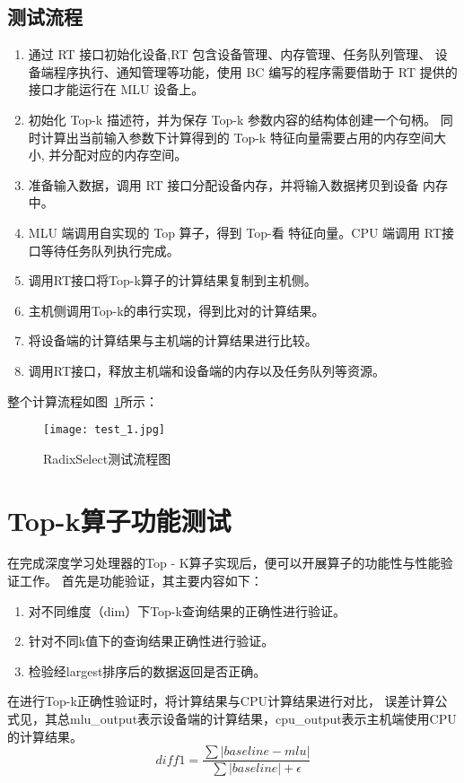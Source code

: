 \subsection{测试流程}
\begin{enumerate}
    \item 通过 RT 接口初始化设备,RT 包含设备管理、内存管理、任务队列管理、 设备端程序执行、通知管理等功能，使用 BC 编写的程序需要借助于 RT 提供的 接口才能运行在 MLU 设备上。
    \item 初始化 Top-k 描述符，并为保存 Top-k 参数内容的结构体创建一个句柄。 同时计算出当前输入参数下计算得到的 Top-k 特征向量需要占用的内存空间大 小, 并分配对应的内存空间。
    \item 准备输入数据，调用 RT 接口分配设备内存，并将输入数据拷贝到设备 内存中。
    \item MLU 端调用自实现的 Top 算子，得到 Top-看 特征向量。CPU 端调用 RT接口等待任务队列执行完成。
    \item 调用RT接口将Top-k算子的计算结果复制到主机侧。
    \item 主机侧调用Top-k的串行实现，得到比对的计算结果。
    \item 将设备端的计算结果与主机端的计算结果进行比较。
    \item 调用RT接口，释放主机端和设备端的内存以及任务队列等资源。
    
\end{enumerate}
整个计算流程如图~\ref{fig:test}所示：

\begin{figure}[ht]
    \centering
    \texttt{[image: test\_1.jpg]}
    \caption{RadixSelect测试流程图}
    \label{fig:test}
\end{figure}


\section{Top-k算子功能测试}
在完成深度学习处理器的Top - K算子实现后，便可以开展算子的功能性与性能验证工作。
首先是功能验证，其主要内容如下：
\begin{enumerate}
\item 对不同维度（dim）下Top-k查询结果的正确性进行验证。
\item 针对不同k值下的查询结果正确性进行验证。
\item 检验经largest排序后的数据返回是否正确。
\end{enumerate}

在进行Top-k正确性验证时，将计算结果与CPU计算结果进行对比，
误差计算公式见，其总mlu\_output表示设备端的计算结果，cpu\_output表示主机端使用CPU的计算结果。
    \begin{equation}
    \label{eq:diff1}
    diff1 = \frac{\sum \vert baseline - mlu \vert}{\sum \vert baseline \vert + \epsilon}
    \end{equation}
    
